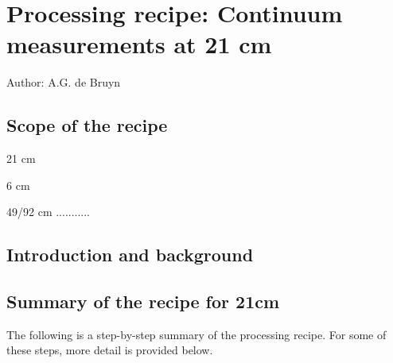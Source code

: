 %
%
%
%
\chapter{Processing recipe: Continuum measurements at 21 cm} 
\tableofcontents 

Author: A.G. de Bruyn 

\section{Scope of the recipe} 
\label{.scope} 

21 cm 

6 cm 

49/92 cm ........... 




\section{Introduction and background} 
\label{.intro} 


\section{Summary of the recipe for 21cm} 
\label{.summary} 

The following is a step-by-step summary of the processing recipe. For some of
these steps, more detail is provided below. 

